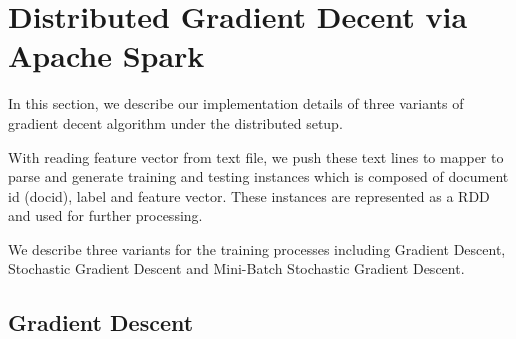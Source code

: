 \documentclass[sigconf]{acmart}
\begin{document}
\section{Distributed Gradient Decent via Apache Spark}
\label{sec:implementation}

In this section, we describe our implementation details of three variants of gradient decent algorithm under the distributed setup. 

With reading feature vector from text file, we push these text lines to mapper to parse and generate training and testing instances which is composed of document id (docid), label and feature vector. These instances are represented as a RDD and used for further processing. 

We describe three variants for the training processes including Gradient Descent, Stochastic Gradient Descent and Mini-Batch Stochastic Gradient Descent.

\subsection{Gradient Descent}
\label{sec:implementationGD}
\end{document}
